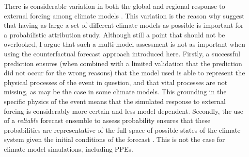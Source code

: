     There is considerable variation in both the global and regional response to external forcing among climate models \cite{meehl_context_2020,seneviratne_regional_2020,masson-delmotte_human_2021,masson-delmotte_earths_2021,masson-delmotte_linking_2021,masson-delmotte_weather_2021}. This variation is the reason why \citet{philip_protocol_2020} suggest that having as large a set of different climate models as possible is important for a probabilistic attribution study. Although still a point that should not be overlooked, I argue that such a multi-model assessment is not as important when using the counterfactual forecast approach introduced here. Firstly, a successful prediction ensures (when combined with a limited validation that the prediction did not occur for the wrong reasons) that the model used is able to represent the physical processes of the event in question, and that vital processes are not missing, as may be the case in some climate models. This grounding in the specific physics of the event means that the simulated response to external forcing is considerably more certain and less model dependent. Secondly, the use of a \emph{reliable} forecast ensemble to assess probability ensures that these probabilities are representative of the full space of possible states of the climate system given the initial conditions of the forecast \citep{murphy_new_1973}. This is not the case for climate model simulations, including PPEs. 
    
